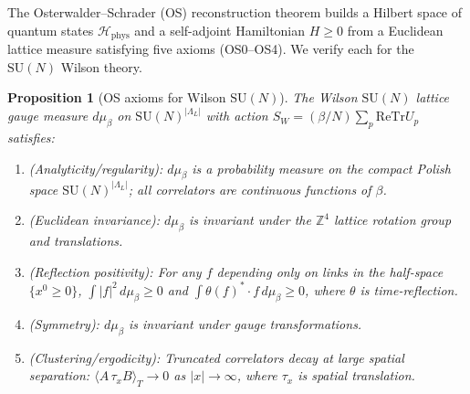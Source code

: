 \documentclass[11pt,a4paper]{amsart}
\newtheorem{proposition}[theorem]{Proposition}
\theoremstyle{definition}
\newcommand{\SU}{\mathrm{SU}}
\newcommand{\Z}{\mathbb{Z}}
\newcommand{\re}{\mathrm{Re}}
\newcommand{\Tr}{\mathrm{Tr}}
\begin{document}
The Osterwalder--Schrader (OS) reconstruction theorem \cite{OS73,OS75}
builds a Hilbert space of quantum states $\mathcal{H}_{\mathrm{phys}}$ and
a self-adjoint Hamiltonian $H \ge 0$ from a Euclidean lattice measure
satisfying five axioms (OS0--OS4).  We verify each for the $\SU(N)$ Wilson theory.

\begin{proposition}[OS axioms for Wilson $\SU(N)$]
\label{prop:OS_axioms}
The Wilson $\SU(N)$ lattice gauge measure $d\mu_\beta$ on
$\SU(N)^{|\Lambda_L|}$ with action $S_W = (\beta/N)\sum_p\re\Tr U_p$ satisfies:
\begin{enumerate}[label=(\textup{OS\arabic*})]
\item \emph{(Analyticity/regularity):} $d\mu_\beta$ is a probability measure on
      the compact Polish space $\SU(N)^{|\Lambda_L|}$; all correlators are
      continuous functions of $\beta$.
\item \emph{(Euclidean invariance):} $d\mu_\beta$ is invariant under
      the $\Z^4$ lattice rotation group and translations.
\item \emph{(Reflection positivity):} For any $f$ depending only on links
      in the half-space $\{x^0 \ge 0\}$,
      $\int |f|^2\, d\mu_\beta \ge 0$ and
      $\int \theta(f)^*\cdot f\, d\mu_\beta \ge 0$,
      where $\theta$ is time-reflection.
\item \emph{(Symmetry):} $d\mu_\beta$ is invariant under gauge transformations.
\item \emph{(Clustering/ergodicity):} Truncated correlators decay at large
      spatial separation: $\langle A\,\tau_x B\rangle_T \to 0$ as $|x|\to\infty$,
      where $\tau_x$ is spatial translation.
\end{enumerate}
\end{proposition}
\end{document}
